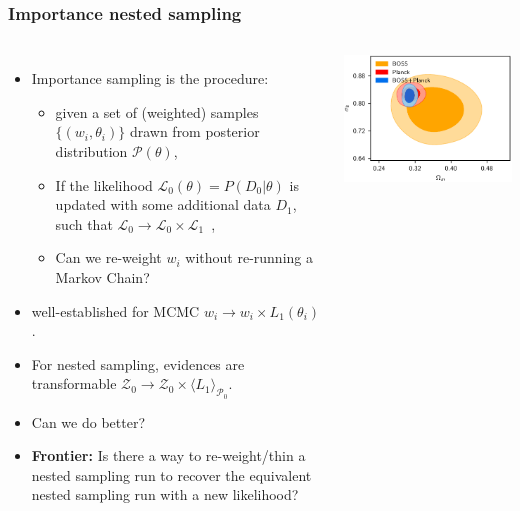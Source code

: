 \documentclass[aspectratio=169]{beamer}
\begin{document}
\begin{frame}
    \frametitle{Importance nested sampling}
    \begin{columns}
    \begin{itemize}
        \item Importance sampling is the procedure:
            \begin{itemize}
                \item given a set of (weighted) samples $\{(w_i,\theta_i)\}$ drawn from posterior distribution $\mathcal{P}(\theta)$,
                \item If the likelihood $\mathcal{L}_0(\theta)=P(D_0|\theta)$ is updated with some additional data $D_1$, such that $\mathcal{L}_0 \to \mathcal{L}_0\times \mathcal{L}_1$~,
                \item Can we re-weight $w_i$ without re-running a Markov Chain?
            \end{itemize}
        \item well-established for MCMC $w_i \to w_i \times L_1(\theta_i)$.
        \item For nested sampling, evidences are transformable $\mathcal{Z}_0\to \mathcal{Z}_0\times\langle L_1\rangle_{\mathcal{P}_0}$.
        \item Can we do better?
        \item \textbf{Frontier:} Is there a way to re-weight/thin a nested sampling run to recover the equivalent nested sampling run with a new likelihood?
    \end{itemize}
    \includegraphics[width=\textwidth]{figures/importance}
    \end{columns}
\end{frame}
\end{document}
